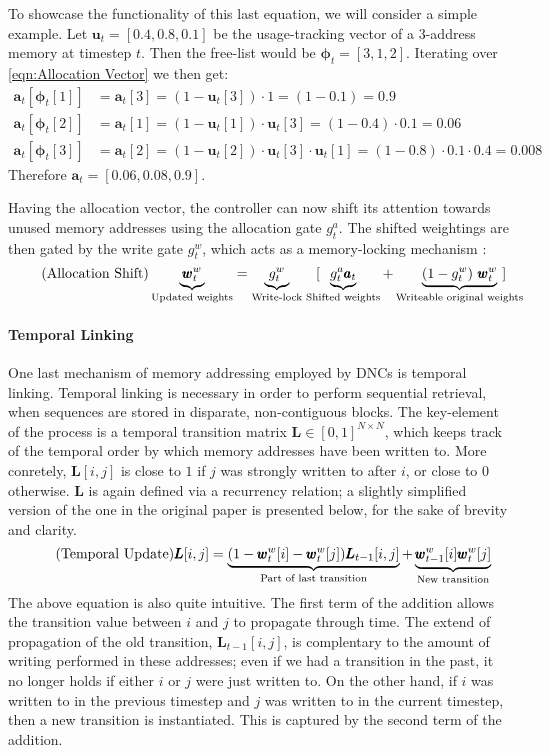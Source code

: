 \documentclass[]{article}
\begin{document}
To showcase the functionality of this last equation, we will consider a simple example. Let $\pmb{u}_t = [0.4, 0.8, 0.1]$ be the usage-tracking vector of a 3-address memory at timestep $t$. Then the free-list would be $\pmb{\phi}_t = [3, 1, 2]$. Iterating over \ref{eqn:Allocation Vector} we then get:
\begin{align*}
\pmb{a}_t[\pmb{\phi}_t[1]] &= \pmb{a}_t[3] = (1-\pmb{u}_t[3]) \cdot 1 = (1-0.1) =0.9 \\
\pmb{a}_t[\pmb{\phi}_t[2]] &= \pmb{a}_t[1] = (1-\pmb{u}_t[1]) \cdot \pmb{u}_t[3] = (1 - 0.4) \cdot 0.1 = 0.06\\
\pmb{a}_t[\pmb{\phi}_t[3]] &= \pmb{a}_t[2] = (1-\pmb{u}_t[2]) \cdot \pmb{u}_t[3] \cdot \pmb{u}_t[1] = (1-0.8) \cdot 0.1 \cdot 0.4 = 0.008
\end{align*}
Therefore $\pmb{a}_t = [0.06, 0.08, 0.9]$. 

Having the allocation vector, the controller can now shift its attention towards unused memory addresses using the allocation gate $g_t^a$. The shifted weightings are then gated by the write gate $g_t^w$, which acts as a memory-locking mechanism :
\[
\tag{Allocation Shift}
\underbrace{\pmb{w}_t^w}_{\text{\scriptsize Updated weights}} = \underbrace{g_t^w}_{\text{Write-lock}} \quad [ \hspace{-10pt} \underbrace{g_t^a \pmb{a}_t}_{\text{\scriptsize Shifted weights}} + \underbrace{(1-g_t^w) \ \pmb{w}_t^w}_{\text{\scriptsize Writeable original weights}} \hspace{-15pt}]
\]

\paragraph{Temporal Linking} One last mechanism of memory addressing employed by DNCs is temporal linking. Temporal linking is necessary in order to perform sequential retrieval, when sequences are stored in disparate, non-contiguous blocks. The key-element of the process is a temporal transition matrix $\pmb{L} \in [0,1]^{N\times N}$, which keeps track of the temporal order by which memory addresses have been written to. More conretely, $\pmb{L}[i,j]$ is close to $1$ if $j$ was strongly written to after $i$, or close to $0$ otherwise. $\pmb{L}$ is again defined via a recurrency relation; a slightly simplified version of the one in the original paper is presented below, for the sake of brevity and clarity.
\[
\tag{Temporal Update}
\pmb{L}[i,j] = \underbrace{(1 - \pmb{w}_t^w[i] - \pmb{w}_t^w[j]) \pmb{L}_{t-1}[i,j]}_{\text{\scriptsize Part of last transition}} + \underbrace{\pmb{w}_{t-1}^w[i] \pmb{w}_{t}^w[j]}_{\text{\scriptsize New transition}}
\]
The above equation is also quite intuitive. The first term of the addition allows the transition value between $i$ and $j$ to propagate through time. The extend of propagation of the old transition, $\pmb{L}_{t-1}[i,j]$, is complentary to the amount of writing performed in these addresses; even if we had a transition in the past, it no longer holds if either $i$ or $j$ were just written to. On the other hand, if $i$ was written to in the previous timestep and $j$ was written to in the current timestep, then a new transition is instantiated. This is captured by the second term of the addition. 
\end{document}
